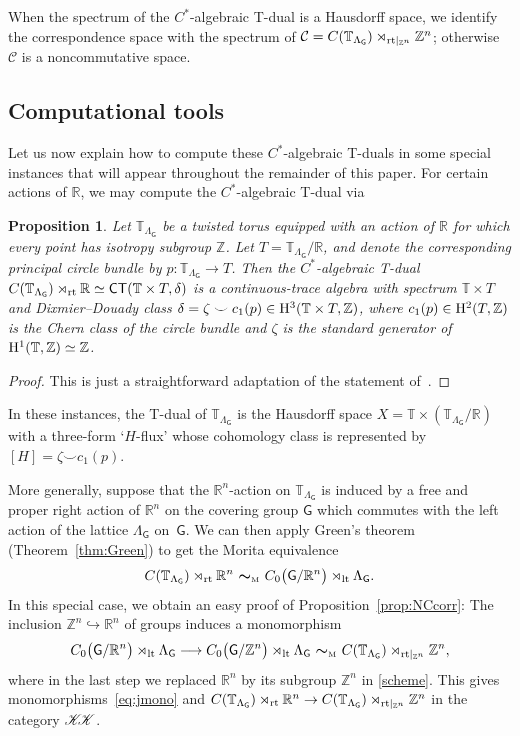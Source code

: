 \documentclass[10pt,a4paper]{amsart}
\numberwithin{equation}{section}
\newcommand{\C}{\complex}
\newcommand{\Z}{\zed}
\newcommand{\mbf}[1]{{\boldsymbol {#1} }}
\def\T{{\sf T}}
\def\C{{\sf C}}
\newcommand{\CCK}{\mathscr{K}}
\newcommand{\Ccal}{\mathcal{C}}
\newcommand{\sfG}{\mathsf{G}}
\newcommand{\rmH}{{\rm H}}
\newcommand{\lt}{{\rm lt}}
\newcommand{\rt}{{\rm rt}}
\newcommand{\R}{\real}
\newcommand{\complex}{{\mathbb C}} %
\newcommand{\zed}{{\mathbb Z}} %
\newcommand{\real}{{\mathbb R}} %
\newcommand{\torus}{{\mathbb T}} %
\newtheorem{Proposition}[Theorem]{Proposition}
 { \theoremstyle{definition}
\newtheorem{Definition}[Theorem]{Definition}
\newtheorem{Note}[Theorem]{Note}
\newtheorem{Example}[Theorem]{Example}
\newtheorem{Remark}[Theorem]{Remark} }
\begin{document}
When the spectrum of the
$C^*$-algebraic T-dual is a Hausdorff space, we identify the
correspondence space with the spectrum of
$\Ccal=C(\torus_{\Lambda_\sfG})\rtimes_{\rt|_{\zed^n}}\zed^n$;
otherwise $\Ccal$ is a noncommutative space.

\subsection{Computational tools}

Let us now explain how to compute these $C^*$-algebraic T-duals in
some special instances that will appear throughout the remainder of
this paper. For certain actions of $\real$, we
may compute the $C^*$-algebraic T-dual via
\begin{Proposition}\label{prop:Raeburn}
Let $\torus_{\Lambda_\sfG}$ be a twisted torus equipped with an action of
$\real$ for which every point has isotropy subgroup $\zed$. Let
$T=\torus_{\Lambda_\sfG}/\real$, and denote the corresponding principal
circle bundle by $p\colon \torus_{\Lambda_\sfG}\to T$. Then the $C^*$-algebraic
T-dual $C(\torus_{\Lambda_\sfG})\rtimes_\rt \real\simeq \C\T(\torus\times T,\delta)$ is a continuous-trace
algebra with spectrum $\torus\times T$ and Dixmier--Douady class
$\delta = \zeta\smile c_1(p)\in \rmH^3(\torus\times T,\Z)$, where
$c_1(p) \in \rmH^2(T,\Z)$ is the Chern class of the circle bundle and $\zeta$ is the
standard generator of $\rmH^1(\torus,\Z)\simeq\Z$.
\end{Proposition}
\begin{proof}
This is just a straightforward adaptation of the statement
of~\cite [Proposition~4.5]{Raeburn1988}.
\end{proof}

In these instances, the T-dual of $\torus_{\Lambda_\sfG}$ is the Hausdorff space $X=\torus\times
(\torus_{\Lambda_\sfG}/\real)$ with a three-form `$H$-flux' whose cohomology class is
represented by $[H] = \zeta\smile c_1(p)$.

More generally, suppose that the $\real^n$-action on $\torus_{\Lambda_\sfG}$ is
induced by a free and proper right action of $\real^n$ on the covering group $\sfG$
which commutes with the left action of the lattice $\Lambda_\sfG$ on~$\sfG$. We can then apply Green's theorem
(Theorem~\ref{thm:Green}) to get the Morita
equivalence
\begin{gather}\label{scheme}
C(\torus_{\Lambda_\sfG})\rtimes_\rt \real^n \ \mbf\sim_{\text{\tiny M}} \
C_0\big(\sfG/\real^n\big)\rtimes_\lt \Lambda_\sfG .
\end{gather}
In this special case, we obtain an easy proof of
Proposition~\ref{prop:NCcorr}: The inclusion
$\Z^n\hookrightarrow\R^n$ of groups induces a monomorphism
\[
C_0\big(\sfG/\real^n\big)\rtimes_\lt \Lambda_\sfG \longrightarrow
C_0\big(\sfG/\Z^n\big)\rtimes_\lt \Lambda_\sfG \ \mbf\sim_{\text{\tiny M}}
 \ C(\torus_{\Lambda_\sfG})\rtimes_{\rt|_{\Z^n}} \Z^n ,
\]
where in the last step we replaced $\R^n$ by its subgroup $\Z^n$ in
\eqref{scheme}. This gives monomor\-phisms~\eqref{eq:jmono} and
$C(\torus_{\Lambda_\sfG})\rtimes_\rt \real^n\to
C(\torus_{\Lambda_\sfG})\rtimes_{\rt|_{\Z^n}} \Z^n$ in the category
$\CCK\hspace{-1mm}\CCK$.
\end{document}

